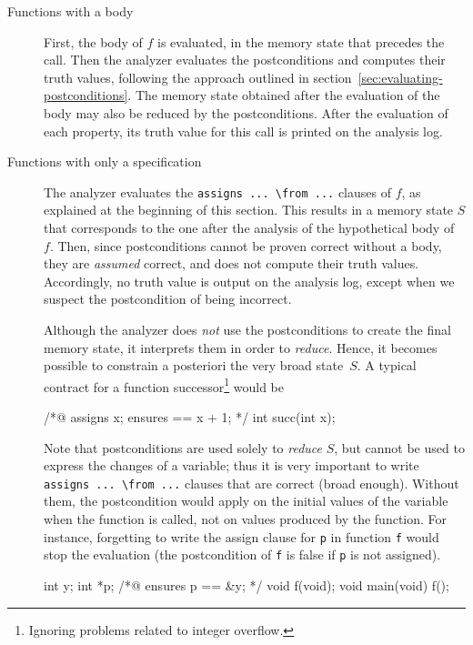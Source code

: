 \documentclass{frama-c-book}
\begin{document}
\begin{description}
\item [Functions with a body]

  First, the body of $f$ is evaluated, in the memory state that
  precedes the call. Then the analyzer evaluates the postconditions
  and computes their truth values, following the approach outlined in
  section~\ref{sec:evaluating-postconditions}. The memory state
  obtained after the evaluation of the body may also be reduced by the
  postconditions. After the evaluation of each property, its truth
  value for this call is printed on the analysis log.

\item [Functions with only a specification] The analyzer evaluates the
  \lstinline|assigns ... \from ...| clauses of $f$, as explained at
  the beginning of this section. This results in a memory state $S$ that
  corresponds to the one after the analysis of the hypothetical body
  of~$f$.
%
  Then, since postconditions cannot be proven correct without a
  body, they are \emph{assumed} correct, and \Eva{} does not
  compute their truth values.  Accordingly, no truth value is output on the
  analysis log, except when we suspect the postcondition of being
  incorrect.

  Although the analyzer does \emph{not} use the postconditions to
  create the final memory state, it interprets them in order to
  \emph{reduce}.  Hence, it becomes possible to constrain a posteriori
  the very broad state~$S$.  A typical contract for a function
  successor\footnote{Ignoring problems related to integer overflow.} would be
\begin{listing}{1}
/*@ assigns \result \from x;
    ensures \result == x + 1; */
int succ(int x);
\end{listing}

  Note that postconditions are used solely to \emph{reduce} $S$, but
  cannot be used to express the changes of a variable; thus it is very
  important to write \lstinline|assigns ... \from ...|
  clauses that are correct (broad enough).
  Without them, the postcondition would apply on the initial values of the
  variable when the function is called, not on values produced by the function.
  For instance, forgetting to
  write the assign clause for \lstinline|p| in function \lstinline|f|
  would stop the evaluation (the postcondition of \lstinline|f| is
  false if \lstinline|p| is not assigned).

\begin{listing}{1}
int y; int *p;
/*@ ensures p == &y; */
void f(void);
void main(void){ f(); }
\end{listing}


\end{description}
\end{document}
